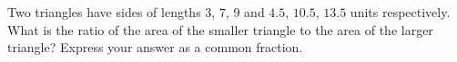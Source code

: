 Two triangles have sides of lengths $3$, $7$, $9$ and $4.5$, $10.5$, $13.5$ units respectively. What is the ratio of the area of the smaller triangle to the area of the larger triangle? Express your answer as a common fraction.

